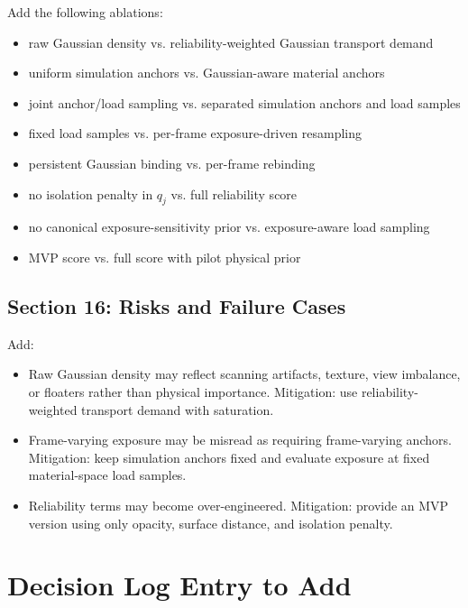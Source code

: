 \documentclass[11pt,a4paper]{article}
\begin{document}
Add the following ablations:

\begin{itemize}[leftmargin=2em]
\item raw Gaussian density vs. reliability-weighted Gaussian transport demand
\item uniform simulation anchors vs. Gaussian-aware material anchors
\item joint anchor/load sampling vs. separated simulation anchors and load samples
\item fixed load samples vs. per-frame exposure-driven resampling
\item persistent Gaussian binding vs. per-frame rebinding
\item no isolation penalty in $q_j$ vs. full reliability score
\item no canonical exposure-sensitivity prior vs. exposure-aware load sampling
\item MVP score vs. full score with pilot physical prior
\end{itemize}

\subsection{Section 16: Risks and Failure Cases}

Add:

\begin{itemize}[leftmargin=2em]
\item Raw Gaussian density may reflect scanning artifacts, texture, view imbalance, or floaters rather than physical importance. Mitigation: use reliability-weighted transport demand with saturation.
\item Frame-varying exposure may be misread as requiring frame-varying anchors. Mitigation: keep simulation anchors fixed and evaluate exposure at fixed material-space load samples.
\item Reliability terms may become over-engineered. Mitigation: provide an MVP version using only opacity, surface distance, and isolation penalty.
\end{itemize}

\section{Decision Log Entry to Add}
\end{document}
